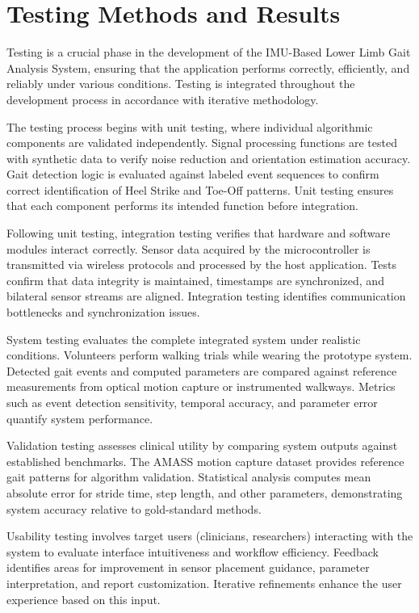 \documentclass[12pt,a4paper]{report}
\begin{document}
\section{Testing Methods and Results}

Testing is a crucial phase in the development of the IMU-Based Lower Limb Gait Analysis System, ensuring that the application performs correctly, efficiently, and reliably under various conditions. Testing is integrated throughout the development process in accordance with iterative methodology.

The testing process begins with unit testing, where individual algorithmic components are validated independently. Signal processing functions are tested with synthetic data to verify noise reduction and orientation estimation accuracy. Gait detection logic is evaluated against labeled event sequences to confirm correct identification of Heel Strike and Toe-Off patterns. Unit testing ensures that each component performs its intended function before integration.

Following unit testing, integration testing verifies that hardware and software modules interact correctly. Sensor data acquired by the microcontroller is transmitted via wireless protocols and processed by the host application. Tests confirm that data integrity is maintained, timestamps are synchronized, and bilateral sensor streams are aligned. Integration testing identifies communication bottlenecks and synchronization issues.

System testing evaluates the complete integrated system under realistic conditions. Volunteers perform walking trials while wearing the prototype system. Detected gait events and computed parameters are compared against reference measurements from optical motion capture or instrumented walkways. Metrics such as event detection sensitivity, temporal accuracy, and parameter error quantify system performance.

Validation testing assesses clinical utility by comparing system outputs against established benchmarks. The AMASS motion capture dataset provides reference gait patterns for algorithm validation. Statistical analysis computes mean absolute error for stride time, step length, and other parameters, demonstrating system accuracy relative to gold-standard methods.

Usability testing involves target users (clinicians, researchers) interacting with the system to evaluate interface intuitiveness and workflow efficiency. Feedback identifies areas for improvement in sensor placement guidance, parameter interpretation, and report customization. Iterative refinements enhance the user experience based on this input.
\end{document}
